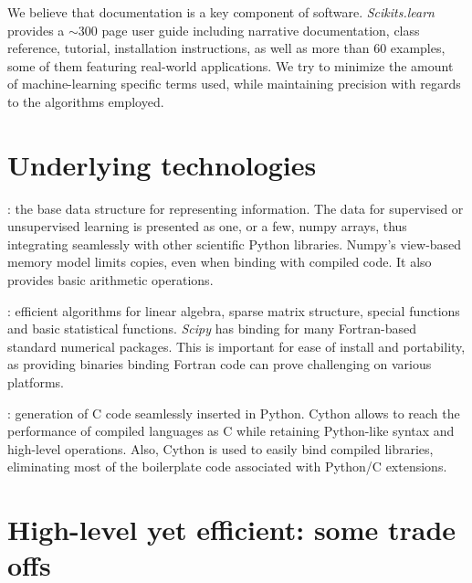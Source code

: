 \documentclass[twoside,11pt]{article}
\begin{document}
\smallskip {}
%
We believe that documentation is a key component of software.
\emph{Scikits.learn} provides a $\sim$300 page user guide including
narrative documentation, class reference, tutorial, installation
instructions, as well as more than 60 examples, some of them featuring
real-world applications. We try to minimize the amount of
machine-learning specific terms used, while maintaining precision with
regards to the algorithms employed.


\section{Underlying technologies}



\smallskip
{}:
%
the base data structure for representing
information. The data for supervised or unsupervised learning is
presented as one, or a few, numpy arrays, thus integrating seamlessly
with other scientific Python libraries. Numpy's view-based memory 
model limits copies, even when binding with compiled code. It also 
provides basic arithmetic operations. 

\smallskip
{}:
%
efficient algorithms for linear algebra, sparse matrix structure, special
functions and basic statistical functions. {\sl Scipy} has binding for
many Fortran-based standard numerical packages. This is important for
ease of install and portability, as providing binaries binding Fortran
code can prove challenging on various platforms. 

\smallskip
{}:
%
generation of C code seamlessly inserted in Python. Cython allows to
reach the performance of compiled languages as C while retaining
Python-like syntax and high-level operations. Also, Cython is used to
easily bind compiled libraries, eliminating most of the boilerplate code
associated with Python/C extensions.


\section{High-level yet efficient: some trade offs}
\end{document}
